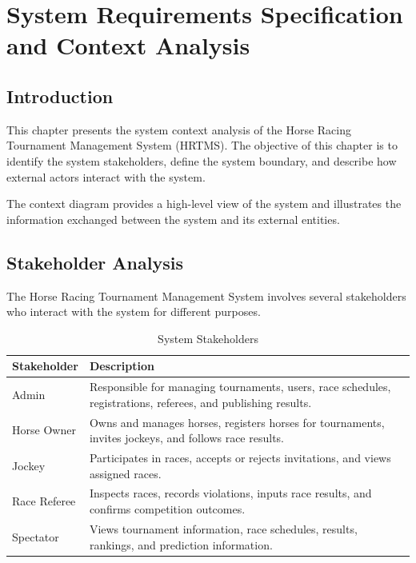 \chapter{System Requirements Specification and Context Analysis}
\label{chap:srs_context}

\section{Introduction}

This chapter presents the system context analysis of the Horse Racing Tournament Management System (HRTMS). The objective of this chapter is to identify the system stakeholders, define the system boundary, and describe how external actors interact with the system.

The context diagram provides a high-level view of the system and illustrates the information exchanged between the system and its external entities.

\section{Stakeholder Analysis}

The Horse Racing Tournament Management System involves several stakeholders who interact with the system for different purposes.

\begin{table}[H]
	\centering
	\caption{System Stakeholders}
	\begin{tabular}{|p{4cm}|p{9cm}|}
		\hline
		\textbf{Stakeholder} & \textbf{Description} \\
		\hline
		Admin & Responsible for managing tournaments, users, race schedules, registrations, referees, and publishing results. \\
		\hline
		Horse Owner & Owns and manages horses, registers horses for tournaments, invites jockeys, and follows race results. \\
		\hline
		Jockey & Participates in races, accepts or rejects invitations, and views assigned races. \\
		\hline
		Race Referee & Inspects races, records violations, inputs race results, and confirms competition outcomes. \\
		\hline
		Spectator & Views tournament information, race schedules, results, rankings, and prediction information. \\
		\hline
	\end{tabular}
\end{table}

